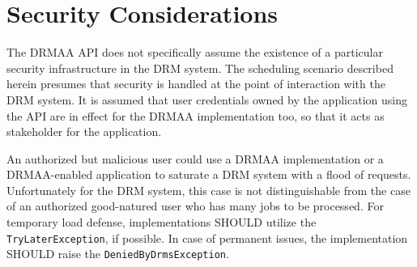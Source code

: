 \documentclass{article}
\newcommand{\h}[1]{\lstinline|#1|}
\begin{document}





























\section{Security Considerations}
\label{sec:security}

The DRMAA API does not specifically assume the existence of a particular security infrastructure in the DRM system. The scheduling scenario described herein presumes that security is handled at the point of interaction with the DRM system. It is assumed that user credentials owned by the application using the API are in effect for the DRMAA implementation too, so that it acts as stakeholder for the application.

An authorized but malicious user could use a DRMAA implementation or a DRMAA-enabled application to saturate a DRM system with a flood of requests. Unfortunately for the DRM system, this case is not distinguishable from the case of an authorized good-natured user who has many jobs to be processed. For temporary load defense, implementations SHOULD utilize the \h{TryLaterException}, if possible. In case of permanent issues, the implementation SHOULD raise the \h{DeniedByDrmsException}.
\end{document}
